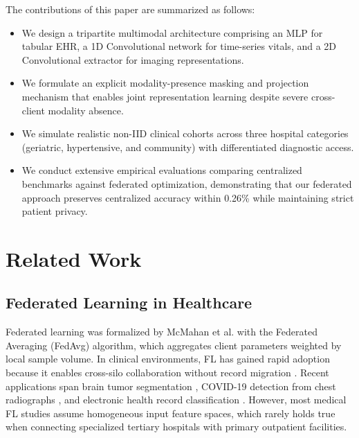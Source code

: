 \documentclass[10pt,conference]{IEEEtran}
\begin{document}
The contributions of this paper are summarized as follows:
\begin{itemize}
    \item We design a tripartite multimodal architecture comprising an MLP for tabular EHR, a 1D Convolutional network for time-series vitals, and a 2D Convolutional extractor for imaging representations.
    \item We formulate an explicit modality-presence masking and projection mechanism that enables joint representation learning despite severe cross-client modality absence.
    \item We simulate realistic non-IID clinical cohorts across three hospital categories (geriatric, hypertensive, and community) with differentiated diagnostic access.
    \item We conduct extensive empirical evaluations comparing centralized benchmarks against federated optimization, demonstrating that our federated approach preserves centralized accuracy within 0.26\% while maintaining strict patient privacy.
\end{itemize}

\section{Related Work}

\subsection{Federated Learning in Healthcare}
Federated learning was formalized by McMahan et al. \cite{mcmahan2017communication} with the Federated Averaging (FedAvg) algorithm, which aggregates client parameters weighted by local sample volume. In clinical environments, FL has gained rapid adoption because it enables cross-silo collaboration without record migration \cite{rieke2020future, sheller2020federated}. Recent applications span brain tumor segmentation \cite{li2020federated}, COVID-19 detection from chest radiographs \cite{dayan2021federated}, and electronic health record classification \cite{brisimi2018federated}. However, most medical FL studies assume homogeneous input feature spaces, which rarely holds true when connecting specialized tertiary hospitals with primary outpatient facilities.
\end{document}
